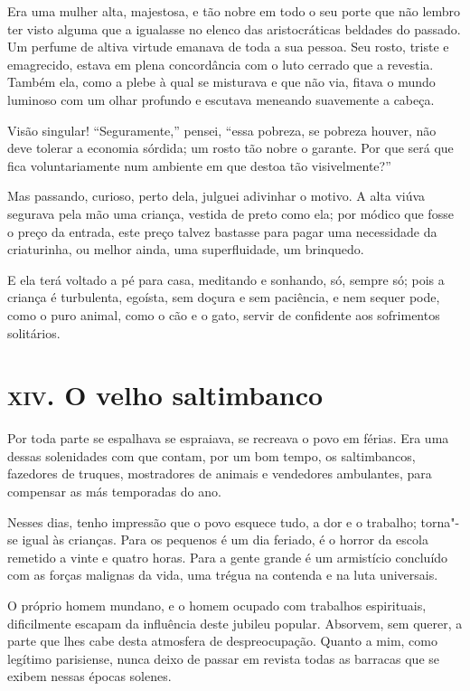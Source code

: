 Era uma mulher alta, majestosa, e tão nobre em todo o seu porte que não
lembro ter visto alguma que a igualasse no elenco das
aristocráticas beldades do passado. Um perfume de altiva virtude
emanava de toda a sua pessoa. Seu rosto, triste e emagrecido, estava em
plena concordância com o luto cerrado que a revestia. Também ela,
como a plebe à qual se misturava e que não via, fitava o mundo
luminoso com um olhar profundo e escutava meneando suavemente a
cabeça.

Visão singular! “Seguramente,'' pensei, “essa pobreza,
se pobreza houver, não deve tolerar a economia sórdida; um rosto tão
nobre o garante. Por que será que fica voluntariamente num ambiente em
que destoa tão visivelmente?''

Mas passando, curioso, perto dela, julguei adivinhar o motivo. A alta
viúva segurava pela mão uma criança, vestida de preto como ela; por
módico que fosse o preço da entrada, este preço talvez bastasse para
pagar uma necessidade da criaturinha, ou melhor ainda, uma
superfluidade, um brinquedo.

E ela terá voltado a pé para casa, meditando e sonhando, só, sempre só;
pois a criança é turbulenta, egoísta, sem doçura e sem paciência, e nem
sequer pode, como o puro animal, como o cão e o gato, servir de
confidente aos sofrimentos solitários.

\chapter{\textsc{xiv.} O velho saltimbanco}

Por toda parte se espalhava se espraiava, se recreava o povo em férias.
Era uma dessas solenidades com que contam, por um bom tempo, os
saltimbancos, fazedores de truques, mostradores de animais e 
vendedores ambulantes, para compensar as más temporadas do ano.

Nesses dias, tenho impressão que o povo esquece tudo, a dor e o trabalho;
torna"-se igual às crianças. Para os pequenos é um dia feriado, é o
horror da escola remetido a vinte e quatro horas. Para a gente grande é
um armistício concluído com as forças malignas da vida, uma trégua na
contenda e na luta universais.

O próprio homem mundano, e o homem ocupado com trabalhos espirituais, dificilmente escapam da influência deste jubileu popular. 
Absorvem, sem querer, a parte que lhes cabe desta atmosfera de
despreocupação. Quanto a mim, como legítimo parisiense, nunca deixo
de passar em revista todas as barracas que se exibem nessas épocas
solenes.

